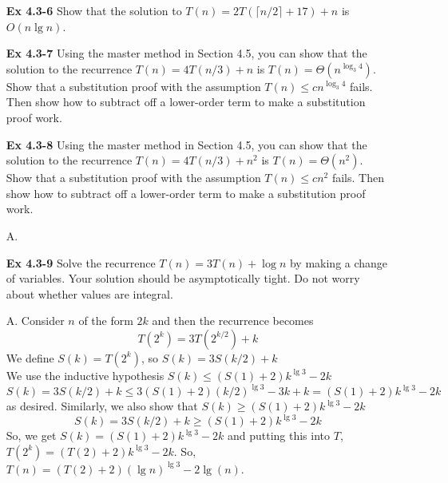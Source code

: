 \documentclass[fontsize=12pt,paper=a4]{book}
\begin{document}
\begin{enumerate}
 \item[\textbf{Ex 4.3-6}]
       Show that the solution to $T(n) = 2T(\lceil n/2 \rceil + 17) + n$ is $O(n \lg n)$.
       
 \item[\textbf{Ex 4.3-7}]
       Using the master method in Section 4.5, you can show that the solution to the recurrence $T(n) = 4T(n/3)+n$ is $T(n) = \Theta(n^{\log_3 4})$. Show that a substitution proof with the assumption $T(n) \leq cn^{\log_3 4}$ fails. Then show how to subtract off a lower-order term to make a substitution proof work.
       
 \item[\textbf{Ex 4.3-8}]
       Using the master method in Section 4.5, you can show that the solution to the recurrence $T(n) = 4T(n/3)+n^2$ is $T(n) = \Theta(n^2)$. Show that a substitution proof with the assumption $T(n) \leq cn^2$ fails. Then show how to subtract off a lower-order term to make a substitution proof work.
 \item[A.]
       
 \item[\textbf{Ex 4.3-9}]
       Solve the recurrence $T(n) = 3T(n) + \log n$ by making a change of variables. Your solution should be asymptotically tight. Do not worry about whether values are integral.
 \item[A.]
       Consider $n$ of the form $2k$ and then the recurrence becomes
       \[T(2^k) = 3T(2^{k/2}) + k\]
       We define $S(k) = T(2^k)$, so $S(k) = 3S(k/2) + k$ \\
       We use the inductive hypothesis $S(k) \leq (S(1)+2)k^{\lg 3} - 2k$
       \[ S(k) = 3S(k/2) + k \leq 3 (S(1) +2) (k/2)^{\lg 3} - 3k + k = (S(1) + 2)k^{\lg 3} - 2k \]
       as desired. Similarly, we also show that $S(k) \geq (S(1) + 2)k^{\lg 3} - 2k$
       \[ S(k) = 3S(k/2) + k \geq (S(1) + 2)k^{\lg 3} - 2k\]
       So, we get $S(k) = (S(1) + 2)k^{\lg 3} - 2k$ and putting this into $T$, $T(2^k) = (T(2) + 2)k^{\lg 3} - 2k$. So, $T(n) = (T(2) + 2)(\lg n)^{\lg 3} - 2\lg(n)$.
\end{enumerate}
\end{document}
